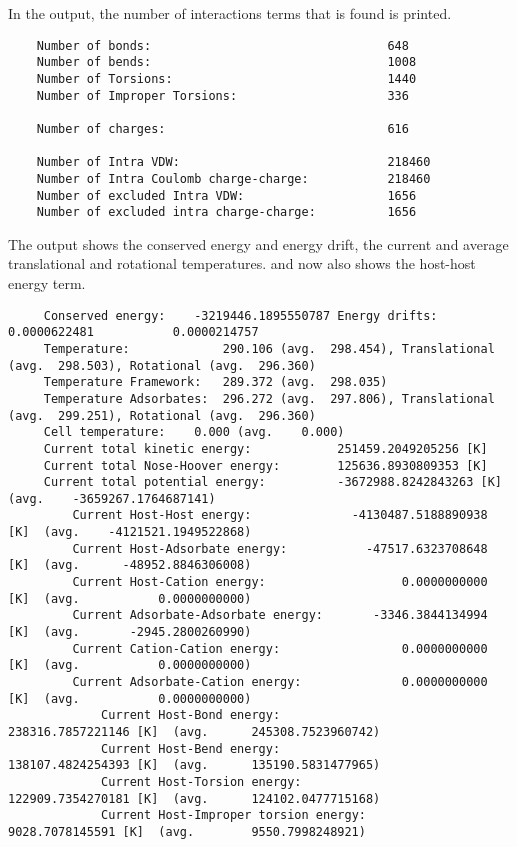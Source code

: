 \noindent
In the output, the number of interactions terms that is found is printed.
\begin{tiny}
\begin{verbatim}
    Number of bonds:                                 648
    Number of bends:                                 1008
    Number of Torsions:                              1440
    Number of Improper Torsions:                     336

    Number of charges:                               616

    Number of Intra VDW:                             218460
    Number of Intra Coulomb charge-charge:           218460
    Number of excluded Intra VDW:                    1656
    Number of excluded intra charge-charge:          1656

\end{verbatim}
\end{tiny}


\noindent
The output shows the conserved energy and energy drift, the current and average translational and rotational temperatures.
and now also shows the host-host energy term.
\begin{tiny}
\begin{verbatim}
     Conserved energy:    -3219446.1895550787 Energy drifts:  0.0000622481           0.0000214757
     Temperature:             290.106 (avg.  298.454), Translational (avg.  298.503), Rotational (avg.  296.360)
     Temperature Framework:   289.372 (avg.  298.035)
     Temperature Adsorbates:  296.272 (avg.  297.806), Translational (avg.  299.251), Rotational (avg.  296.360)
     Cell temperature:    0.000 (avg.    0.000)
     Current total kinetic energy:            251459.2049205256 [K]
     Current total Nose-Hoover energy:        125636.8930809353 [K]
     Current total potential energy:          -3672988.8242843263 [K]  (avg.    -3659267.1764687141)
         Current Host-Host energy:              -4130487.5188890938 [K]  (avg.    -4121521.1949522868)
         Current Host-Adsorbate energy:           -47517.6323708648 [K]  (avg.      -48952.8846306008)
         Current Host-Cation energy:                   0.0000000000 [K]  (avg.           0.0000000000)
         Current Adsorbate-Adsorbate energy:       -3346.3844134994 [K]  (avg.       -2945.2800260990)
         Current Cation-Cation energy:                 0.0000000000 [K]  (avg.           0.0000000000)
         Current Adsorbate-Cation energy:              0.0000000000 [K]  (avg.           0.0000000000)
             Current Host-Bond energy:                  238316.7857221146 [K]  (avg.      245308.7523960742)
             Current Host-Bend energy:                  138107.4824254393 [K]  (avg.      135190.5831477965)
             Current Host-Torsion energy:               122909.7354270181 [K]  (avg.      124102.0477715168)
             Current Host-Improper torsion energy:        9028.7078145591 [K]  (avg.        9550.7998248921)
\end{verbatim}
\end{tiny}

